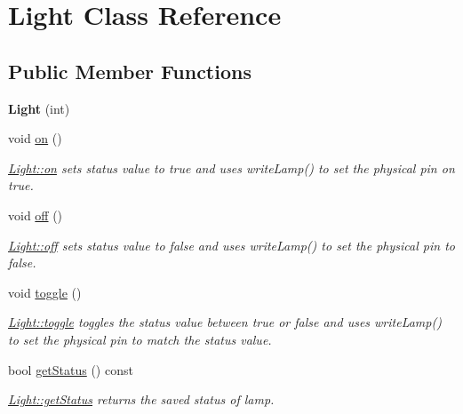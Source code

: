 \hypertarget{class_light}{}\section{Light Class Reference}
\label{class_light}
\subsection*{Public Member Functions}
\begin{DoxyCompactItemize}
\item 
\hypertarget{class_light_ad6867027c5eedf613e052ea72785c593}{}{\bfseries Light} (int)\label{class_light_ad6867027c5eedf613e052ea72785c593}

\item 
\hypertarget{class_light_ad9fb41a63e70897c02e952b17a642fee}{}void \hyperlink{class_light_ad9fb41a63e70897c02e952b17a642fee}{on} ()\label{class_light_ad9fb41a63e70897c02e952b17a642fee}

\begin{DoxyCompactList}\small\item\em \hyperlink{class_light_ad9fb41a63e70897c02e952b17a642fee}{Light\+::on} sets status value to true and uses write\+Lamp() to set the physical pin on true. \end{DoxyCompactList}\item 
\hypertarget{class_light_a42aa86ce97479fac88e7fa6e2975d40d}{}void \hyperlink{class_light_a42aa86ce97479fac88e7fa6e2975d40d}{off} ()\label{class_light_a42aa86ce97479fac88e7fa6e2975d40d}

\begin{DoxyCompactList}\small\item\em \hyperlink{class_light_a42aa86ce97479fac88e7fa6e2975d40d}{Light\+::off} sets status value to false and uses write\+Lamp() to set the physical pin to false. \end{DoxyCompactList}\item 
\hypertarget{class_light_a6b448ef7220ec4bba9fb46b47a158a04}{}void \hyperlink{class_light_a6b448ef7220ec4bba9fb46b47a158a04}{toggle} ()\label{class_light_a6b448ef7220ec4bba9fb46b47a158a04}

\begin{DoxyCompactList}\small\item\em \hyperlink{class_light_a6b448ef7220ec4bba9fb46b47a158a04}{Light\+::toggle} toggles the status value between true or false and uses write\+Lamp() to set the physical pin to match the status value. \end{DoxyCompactList}\item 
bool \hyperlink{class_light_a8556e13a369bc3b13d47108ff4738a16}{get\+Status} () const 
\begin{DoxyCompactList}\small\item\em \hyperlink{class_light_a8556e13a369bc3b13d47108ff4738a16}{Light\+::get\+Status} returns the saved status of lamp. \end{DoxyCompactList}\end{DoxyCompactItemize}


